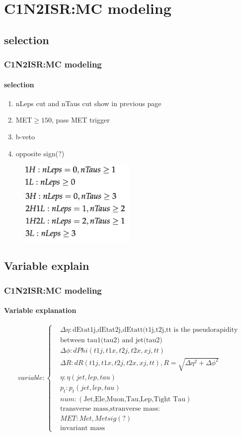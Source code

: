 \documentclass[usenames,dvipsnames]{beamer}
\begin{document}
\section{C1N2ISR:MC modeling}
\subsection{selection}
\begin{frame}
\frametitle{C1N2ISR:MC modeling}
\framesubtitle{selection}
\begin{enumerate}
	\item nLeps cut and nTaus cut show in previous page
	\item MET$\geq 150$, pass MET trigger
	\item b-veto
	\item opposite sign(?)
\end{enumerate}
\begin{figure}
	\centering
	\includegraphics[width = 0.5\textwidth]{graphics/cut.png}
\end{figure}
\end{frame}

\subsection{Variable explain}
\begin{frame}
	\frametitle{C1N2ISR:MC modeling}
	\framesubtitle{Variable explanation}
\begin{equation*}
	variable:\left\{
	\begin{split}
		&\Delta\eta:\text{dEtat1j,dEtat2j,dEtatt(t1j,t2j,tt is the pseudorapidity}\\ 
		&\text{between tau1(tau2) and jet(tau2)}\\
		&\Delta\phi:dPhi(t1j,t1x,t2j,t2x,xj,tt)\\
		&\Delta R:dR(t1j,t1x,t2j,t2x,xj,tt),R = \sqrt{\Delta\eta^2 + \Delta\phi^2}\\
		&\eta:\eta(jet,lep,tau)\\
		&p_t:p_t(jet,lep,tau)\\
		&num:(\text{Jet,Ele,Muon,Tau,Lep,Tight Tau})\\
		&\text{transverse mass,stranverse mass:}\\
		&MET:Met, Metsig(?)\\
		&\text{invariant mass}
	\end{split}
	\right.
\end{equation*}
\end{frame}
\end{document}

